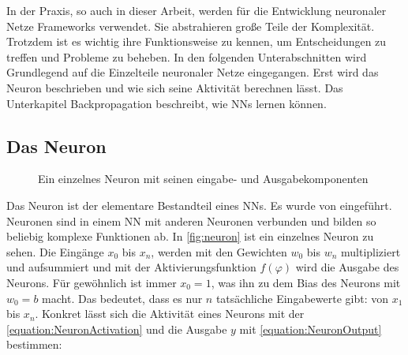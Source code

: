 In der Praxis, so auch in dieser Arbeit, werden für die Entwicklung neuronaler Netze Frameworks verwendet. Sie abstrahieren große Teile der Komplexität. Trotzdem ist es wichtig ihre Funktionsweise zu kennen, um Entscheidungen zu treffen und Probleme zu beheben. In den folgenden Unterabschnitten wird Grundlegend auf die Einzelteile neuronaler Netze eingegangen. Erst wird das Neuron beschrieben und wie sich seine Aktivität berechnen lässt. Das Unterkapitel Backpropagation beschreibt, wie \acp{NN} lernen können.

\subsection{Das Neuron}

\begin{figure}
  \centering
  \caption{Ein einzelnes Neuron mit seinen eingabe- und Ausgabekomponenten}
  \label{fig:neuron}
\end{figure}

Das Neuron ist der elementare Bestandteil eines \acp{NN}. Es wurde \citeyear{McCulloch1943} von \citeauthor{McCulloch1943} \cite{McCulloch1943} eingeführt. Neuronen sind in einem \ac{NN} mit anderen Neuronen verbunden und bilden so beliebig komplexe Funktionen ab. In \autoref{fig:neuron} ist ein einzelnes Neuron zu sehen. Die Eingänge $x_{0}$ bis $x_{n}$, werden mit den Gewichten $w_{0}$ bis $w_{n}$ multipliziert und aufsummiert und mit der Aktivierungsfunktion $f(\varphi)$ wird die Ausgabe des Neurons. Für gewöhnlich ist immer $x_{0}=1$, was ihn zu dem Bias des Neurons mit $w_{0}=b$ macht. Das bedeutet, dass es nur $n$ tatsächliche Eingabewerte gibt: von $x_{1}$ bis $x_{n}$. Konkret lässt sich die Aktivität eines Neurons mit der \autoref{equation:NeuronActivation} und die Ausgabe $y$ mit \autoref{equation:NeuronOutput} bestimmen:

